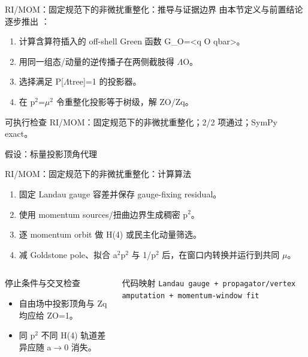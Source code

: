 \begin{frame}[t]{RI/\allowbreak{}MOM：固定规范下的非微扰重整化：推导与证据边界}
\footnotesize
{}\quad 由本节定义与前置结论逐步推出 ：
\begin{enumerate}
\item 计算含算符插入的 off-shell Green 函数 G\_O=<q O qbar>。
\item 用同一组态/\allowbreak{}动量的逆传播子在两侧截肢得 \ensuremath{\Lambda}O。
\item 选择满足 P[\ensuremath{\Lambda}tree]=1 的投影器。
\item 在 p\ensuremath{^{2}}=\ensuremath{\mu}\ensuremath{^{2}} 令重整化投影等于树级，解 ZO/\allowbreak{}Zq。
\end{enumerate}\begin{block}{可执行检查}
\quad RI/\allowbreak{}MOM：固定规范下的非微扰重整化；2/2 项通过；SymPy exact。
\par\scriptsize 假设：标量投影顶角代理
\end{block}
\end{frame}

\begin{frame}[t]{RI/\allowbreak{}MOM：固定规范下的非微扰重整化：计算算法}
\footnotesize
{}\begin{enumerate}
\item 固定 Landau gauge 容差并保存 gauge-fixing residual。
\item 使用 momentum sources/\allowbreak{}扭曲边界生成稠密 p\ensuremath{^{2}}。
\item 逐 momentum orbit 做 H(4) 或民主化动量筛选。
\item 减 Goldstone pole、拟合 a\ensuremath{^{2}}p\ensuremath{^{2}} 与 1/\allowbreak{}p\ensuremath{^{2}} 后，在窗口内转换并运行到共同 \ensuremath{\mu}。
\end{enumerate}\begin{columns}[T,onlytextwidth]
\begin{block}{停止条件与交叉检查}\scriptsize\begin{itemize}
\item[\CheckMark] 自由场中投影顶角与 Zq 均应给 ZO=1。
\item[\CheckMark] 同 p\ensuremath{^{2}} 不同 H(4) 轨道差异应随 a\ensuremath{\rightarrow}0 消失。
\end{itemize}\end{block}
\begin{block}{代码映射}
\scriptsize \texttt{Landau gauge + propagator/\allowbreak{}vertex amputation + momentum-window fit}
\end{block}\end{columns}\end{frame}

